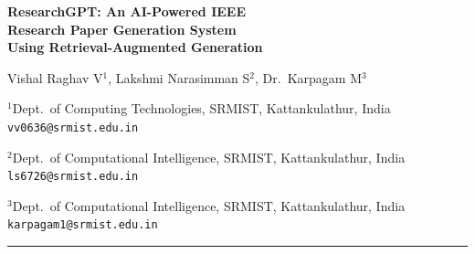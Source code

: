 \documentclass[12pt, a4paper]{article}
\begin{document}
\begin{center}

  {\Huge\bfseries ResearchGPT: An AI-Powered IEEE\\[0.4em]
   Research Paper Generation System\\[0.4em]
   Using Retrieval-Augmented Generation}

  \vspace{1.6em}

  {\large
    Vishal Raghav V$^{1}$,\quad
    Lakshmi Narasimman S$^{2}$,\quad
    Dr.\ Karpagam M$^{3}$}

  \vspace{1em}

  {\small
    $^{1}$Dept.\ of Computing Technologies, SRMIST, Kattankulathur, India\\
    \texttt{vv0636@srmist.edu.in}}

  \vspace{0.5em}

  {\small
    $^{2}$Dept.\ of Computational Intelligence, SRMIST, Kattankulathur, India\\
    \texttt{ls6726@srmist.edu.in}}

  \vspace{0.5em}

  {\small
    $^{3}$Dept.\ of Computational Intelligence, SRMIST, Kattankulathur, India\\
    \texttt{karpagam1@srmist.edu.in}}

\end{center}

\vspace{1em}
\noindent\rule{\linewidth}{0.5pt}
\vspace{0.3em}
\end{document}
